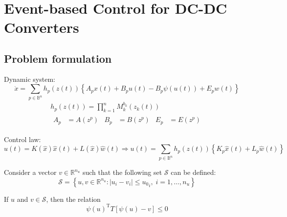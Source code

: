 \chapter{Event-based Control for DC-DC Converters}

\section{Problem formulation}

Dynamic system:
\begin{equation}
  \dot x = \sum\limits_{p\in \mathbb{B}^n} h_p(z(t))
  \left\{A_p x(t) + B_p u(t) - B_p \psi(u(t)) + E_p w(t)\right\}
\end{equation}
\begin{gather}
  h_p(z(t)) = \prod\limits_{k=1}^n M_k^{b_k} (z_k(t)) \\
  \begin{align}
    A_p & = A(z^p) & B_p & = B(z^p) & E_p & = E(z^p)
  \end{align}
\end{gather}

Control law:
\begin{equation}
  u(t) = K(\hat x) \hat x(t) + L(\hat x) \hat w(t) \Rightarrow u(t) =  \sum\limits_{p\in \mathbb{B}^n} h_p(z(t))
  \left\{K_p \hat x(t)+ L_p \hat w(t)\right\}
\end{equation}

Consider a vector \( v \in \mathbb{R}^{n_u} \) such that the following set \(\mathcal{S}\) can be defined:
\begin{equation}
  \mathcal{S} = \left\{ u, v \in \mathbb{R}^{n_u} : |u_i - v_i| \leq {u_0}_i,\; i = 1, \dots, n_u \right\}
\end{equation}

If \( u \) and \( v \in \mathcal{S} \), then the relation
\begin{equation}
  \psi(u)^{\text{T}} T \left[\psi(u) - v\right] \leq 0
\end{equation}

